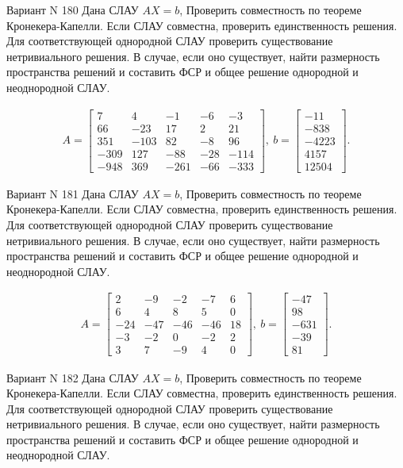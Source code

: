 \documentclass[11pt]{report}
\begin{document}
Вариант N 180
Дана СЛАУ $AX = b$,
Проверить совместность по теореме Кронекера-Капелли. Если СЛАУ совместна, проверить единственность решения.
Для соответствующей однородной СЛАУ проверить существование нетривиального решения. В случае, если оно существует,
найти размерность пространства решений и составить ФСР и общее решение однородной  и неоднородной СЛАУ.


\begin{align*}
 A = \left[\begin{matrix}7 & 4 & -1 & -6 & -3\\66 & -23 & 17 & 2 & 21\\351 & -103 & 82 & -8 & 96\\-309 & 127 & -88 & -28 & -114\\-948 & 369 & -261 & -66 & -333\end{matrix}\right],
\ b = \left[\begin{matrix}-11\\-838\\-4223\\4157\\12504\end{matrix}\right]. 
 \end{align*}

Вариант N 181
Дана СЛАУ $AX = b$,
Проверить совместность по теореме Кронекера-Капелли. Если СЛАУ совместна, проверить единственность решения.
Для соответствующей однородной СЛАУ проверить существование нетривиального решения. В случае, если оно существует,
найти размерность пространства решений и составить ФСР и общее решение однородной  и неоднородной СЛАУ.


\begin{align*}
 A = \left[\begin{matrix}2 & -9 & -2 & -7 & 6\\6 & 4 & 8 & 5 & 0\\-24 & -47 & -46 & -46 & 18\\-3 & -2 & 0 & -2 & 2\\3 & 7 & -9 & 4 & 0\end{matrix}\right],
\ b = \left[\begin{matrix}-47\\98\\-631\\-39\\81\end{matrix}\right]. 
 \end{align*}

Вариант N 182
Дана СЛАУ $AX = b$,
Проверить совместность по теореме Кронекера-Капелли. Если СЛАУ совместна, проверить единственность решения.
Для соответствующей однородной СЛАУ проверить существование нетривиального решения. В случае, если оно существует,
найти размерность пространства решений и составить ФСР и общее решение однородной  и неоднородной СЛАУ.
\end{document}
